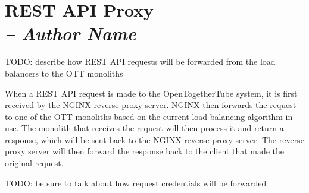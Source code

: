 \chapter{REST API Proxy \\
  \small{\textit{-- Author Name}}
  \label{Chapter::RestApiProxy}}


TODO: describe how REST API requests will be forwarded from the load balancers to the OTT monoliths

When a REST API request is made to the OpenTogetherTube system, it is first received by the NGINX reverse proxy server. 
NGINX then forwards the request to one of the OTT monoliths based on the current load balancing algorithm in use. 
The monolith that receives the request will then process it and return a response, which will be sent back to the 
NGINX reverse proxy server. The reverse proxy server will then forward the response back to the client that made the 
original request.

TODO: be sure to talk about how request credentials will be forwarded